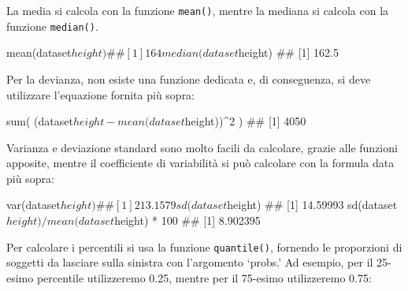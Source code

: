 \documentclass[a4paper,12pt,oneside]{book}
\newenvironment{Shaded}{\begin{snugshade}}{\end{snugshade}}
\newcommand{\DecValTok}[1]{#1}
\newcommand{\FloatTok}[1]{#1}
\newcommand{\SpecialCharTok}[1]{#1}
\newcommand{\DocumentationTok}[1]{#1}
\newcommand{\FunctionTok}[1]{#1}
\newcommand{\AttributeTok}[1]{#1}
\newcommand{\NormalTok}[1]{#1}
\begin{document}
La media si calcola con la funzione \texttt{mean()}, mentre la mediana si calcola con la funzione \texttt{median()}.

\begin{Shaded}
\begin{Highlighting}[]
\FunctionTok{mean}\NormalTok{(dataset}\SpecialCharTok{$}\NormalTok{height)}
\DocumentationTok{\#\# [1] 164}
\FunctionTok{median}\NormalTok{(dataset}\SpecialCharTok{$}\NormalTok{height)}
\DocumentationTok{\#\# [1] 162.5}
\end{Highlighting}
\end{Shaded}

Per la devianza, non esiste una funzione dedicata e, di conseguenza, si deve utilizzare l'equazione fornita più sopra:

\begin{Shaded}
\begin{Highlighting}[]
\FunctionTok{sum}\NormalTok{( (dataset}\SpecialCharTok{$}\NormalTok{height }\SpecialCharTok{{-}} \FunctionTok{mean}\NormalTok{(dataset}\SpecialCharTok{$}\NormalTok{height))}\SpecialCharTok{\^{}}\DecValTok{2}\NormalTok{ )}
\DocumentationTok{\#\# [1] 4050}
\end{Highlighting}
\end{Shaded}

Varianza e deviazione standard sono molto facili da calcolare, grazie alle funzioni apposite, mentre il coefficiente di variabilità si può calcolare con la formula data più sopra:

\begin{Shaded}
\begin{Highlighting}[]
\FunctionTok{var}\NormalTok{(dataset}\SpecialCharTok{$}\NormalTok{height)}
\DocumentationTok{\#\# [1] 213.1579}
\FunctionTok{sd}\NormalTok{(dataset}\SpecialCharTok{$}\NormalTok{height)}
\DocumentationTok{\#\# [1] 14.59993}
\FunctionTok{sd}\NormalTok{(dataset}\SpecialCharTok{$}\NormalTok{height)}\SpecialCharTok{/}\FunctionTok{mean}\NormalTok{(dataset}\SpecialCharTok{$}\NormalTok{height) }\SpecialCharTok{*} \DecValTok{100}
\DocumentationTok{\#\# [1] 8.902395}
\end{Highlighting}
\end{Shaded}

Per calcolare i percentili si usa la funzione \texttt{quantile()}, fornendo le proporzioni di soggetti da lasciare sulla sinistra con l'argomento `probs.' Ad esempio, per il 25-esimo percentile utilizzeremo 0.25, mentre per il 75-esimo utilizzeremo 0.75:

\begin{Shaded}
\end{Shaded}
\end{document}
